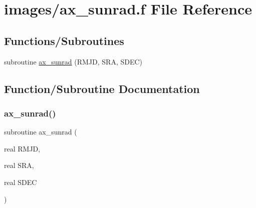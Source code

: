 \hypertarget{ax__sunrad_8f}{}\section{images/ax\+\_\+sunrad.f File Reference}
\label{ax__sunrad_8f}
\subsection*{Functions/\+Subroutines}
\begin{DoxyCompactItemize}
\item 
subroutine \hyperlink{ax__sunrad_8f_ad656c8db1208209830406f0e798131c2}{ax\+\_\+sunrad} (R\+M\+JD, S\+RA, S\+D\+EC)
\end{DoxyCompactItemize}


\subsection{Function/\+Subroutine Documentation}
\mbox{\label{ax__sunrad_8f_ad656c8db1208209830406f0e798131c2}} 
\subsubsection{\texorpdfstring{ax\+\_\+sunrad()}{ax\_sunrad()}}
{\footnotesize\ttfamily subroutine ax\+\_\+sunrad (\begin{DoxyParamCaption}\item[{real}]{R\+M\+JD,  }\item[{real}]{S\+RA,  }\item[{real}]{S\+D\+EC }\end{DoxyParamCaption})}

